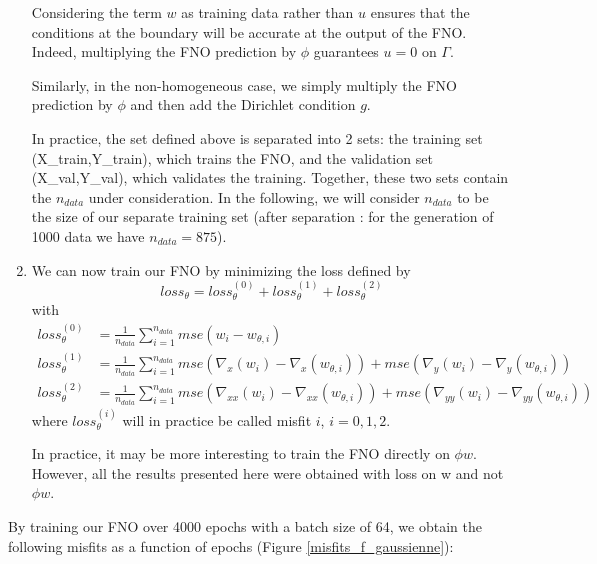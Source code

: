 \begin{enumerate}[label=\textbullet]
	\begin{Rem}
		Considering the term $w$ as training data rather than $u$ ensures that the conditions at the boundary will be accurate at the output of the FNO. Indeed, multiplying the FNO prediction by $\phi$ guarantees $u=0$ on $\Gamma$. 
		
		Similarly, in the non-homogeneous case, we simply multiply the FNO prediction by $\phi$ and then add the Dirichlet condition $g$.
	\end{Rem}
	
	\begin{Rem}
		In practice, the set defined above is separated into 2 sets: the training set (X\_train,Y\_train), which trains the FNO, and the validation set (X\_val,Y\_val), which validates the training. Together, these two sets contain the $n_{data}$ under consideration. In the following, we will consider $n_{data}$ to be the size of our separate training set (after separation : for the generation of 1000 data we have $n_{data}=875$). 
	\end{Rem}
	\item We can now train our FNO by minimizing the loss defined by
	\begin{equation*}
		loss_\theta = loss_\theta^{(0)} + loss_\theta^{(1)} + loss_\theta^{(2)}
	\end{equation*}
	with 
	\begin{align*}
		loss_\theta^{(0)} &= \frac{1}{n_{data}}\sum_{i=1}^{n_{data}} mse(w_i-w_{\theta,i}) \\
		loss_\theta^{(1)} &= \frac{1}{n_{data}}\sum_{i=1}^{n_{data}} mse(\nabla_x(w_i)-\nabla_x(w_{\theta,i}))+mse(\nabla_y(w_i)-\nabla_y(w_{\theta,i})) \\
		loss_\theta^{(2)} &= \frac{1}{n_{data}}\sum_{i=1}^{n_{data}} mse(\nabla_{xx}(w_i)-\nabla_{xx}(w_{\theta,i})) + mse(\nabla_{yy}(w_i)-\nabla_{yy}(w_{\theta,i}))
	\end{align*}
	where $loss_\theta^{(i)}$ will in practice be called misfit $i$, $i=0,1,2$.
	\begin{Rem}
		In practice, it may be more interesting to train the FNO directly on $\phi w$. However, all the results presented here were obtained with loss on w and not $\phi w$.
	\end{Rem}
\end{enumerate}

By training our FNO over 4000 epochs with a batch size of 64, we obtain the following misfits as a function of epochs (Figure \ref{misfits_f_gaussienne}):

